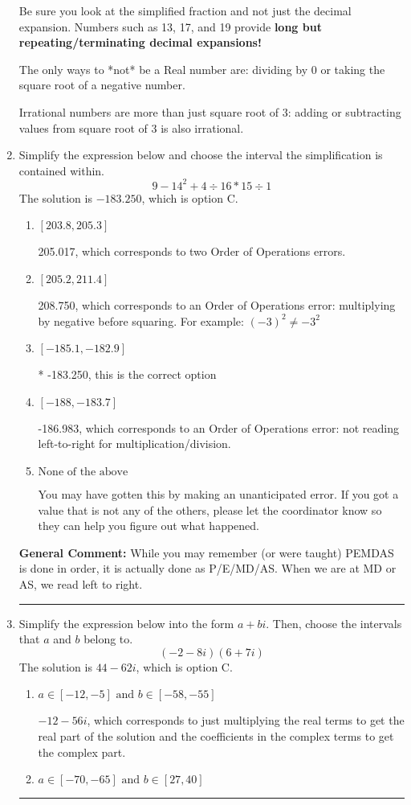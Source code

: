 \documentclass{extbook}[14pt]
\newcommand{\litem}[1]{\item #1

\rule{\textwidth}{0.4pt}}
\begin{document}
\begin{enumerate}
{ Be sure you look at the simplified fraction and not just the decimal expansion. Numbers such as 13, 17, and 19 provide \textbf{long but repeating/terminating decimal expansions!} 
 
 The only ways to *not* be a Real number are: dividing by 0 or taking the square root of a negative number. 
 
 Irrational numbers are more than just square root of 3: adding or subtracting values from square root of 3 is also irrational.
}
\litem{
Simplify the expression below and choose the interval the simplification is contained within.
\[ 9 - 14^2 + 4 \div 16 * 15 \div 1 \]The solution is \( -183.250 \), which is option C.\begin{enumerate}[label=\Alph*.]
\item \( [203.8, 205.3] \)

 205.017, which corresponds to two Order of Operations errors.
\item \( [205.2, 211.4] \)

 208.750, which corresponds to an Order of Operations error: multiplying by negative before squaring. For example: $(-3)^2 \neq -3^2$
\item \( [-185.1, -182.9] \)

* -183.250, this is the correct option
\item \( [-188, -183.7] \)

 -186.983, which corresponds to an Order of Operations error: not reading left-to-right for multiplication/division.
\item \( \text{None of the above} \)

 You may have gotten this by making an unanticipated error. If you got a value that is not any of the others, please let the coordinator know so they can help you figure out what happened.
\end{enumerate}

\textbf{General Comment:} While you may remember (or were taught) PEMDAS is done in order, it is actually done as P/E/MD/AS. When we are at MD or AS, we read left to right.
}
\litem{
Simplify the expression below into the form $a+bi$. Then, choose the intervals that $a$ and $b$ belong to.
\[ (-2 - 8 i)(6 + 7 i) \]The solution is \( 44 - 62 i \), which is option C.\begin{enumerate}[label=\Alph*.]
\item \( a \in [-12, -5] \text{ and } b \in [-58, -55] \)

 $-12 - 56 i$, which corresponds to just multiplying the real terms to get the real part of the solution and the coefficients in the complex terms to get the complex part.
\item \( a \in [-70, -65] \text{ and } b \in [27, 40] \)


\end{enumerate}}
\end{enumerate}
\end{document}

